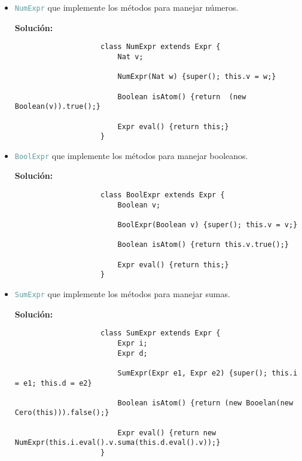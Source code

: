 \documentclass{article}
\newcommand{\tx}[1]{\textcolor{CadetBlue} {\texttt{#1}}}
\newcommand{\tb}[1]{\textcolor{RoyalPurple} {\textbf{#1}}}
\begin{document}
\begin{enumerate}
\begin{enumerate}
            \begin{itemize}
                \item \tx{NumExpr} que implemente los métodos para manejar 
                números.

                \tb{Solución:}

                \begin{verbatim}
                    class NumExpr extends Expr {
                        Nat v;

                        NumExpr(Nat w) {super(); this.v = w;}

                        Boolean isAtom() {return  (new Boolean(v)).true();}

                        Expr eval() {return this;}
                    }
                \end{verbatim}

                \item \tx{BoolExpr} que implemente los métodos para manejar 
                booleanos.

                \tb{Solución:}

                \begin{verbatim}
                    class BoolExpr extends Expr {
                        Boolean v;

                        BoolExpr(Boolean v) {super(); this.v = v;}

                        Boolean isAtom() {return this.v.true();}

                        Expr eval() {return this;}
                    }
                \end{verbatim}

                \item \tx{SumExpr} que implemente los métodos para manejar 
                sumas.

                \tb{Solución:}

                \begin{verbatim}
                    class SumExpr extends Expr {
                        Expr i;
                        Expr d;

                        SumExpr(Expr e1, Expr e2) {super(); this.i = e1; this.d = e2}

                        Boolean isAtom() {return (new Booelan(new Cero(this))).false();}

                        Expr eval() {return new NumExpr(this.i.eval().v.suma(this.d.eval().v));}
                    }
                \end{verbatim}


\end{itemize}
\end{enumerate}
\end{enumerate}
\end{document}
